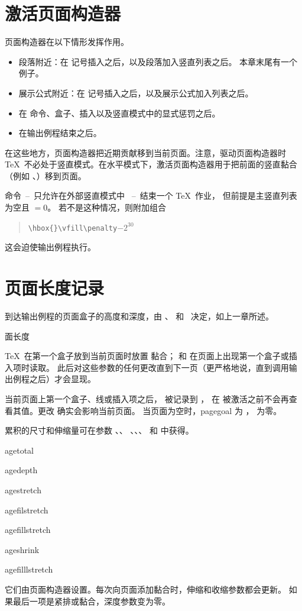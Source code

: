 \documentclass[a4paper]{rapport3}
\makeatletter
\def\ldash{\unskip\ --\nobreak\ \ignorespaces}
\def\rdash{\unskip\nobreak\ --\ \ignorespaces}
\newenvironment{disp}{\begin{quotation}}{\end{quotation}}
\def\term#1\par{\index{#1}}
\def\cstoidx#1\par{\index{#1@\cs{#1}}}
\makeatother
\begin{document}
\section{激活页面构造器}

页面构造器在以下情形发挥作用。
\begin{itemize}\item 段落附近：在  记号插入之后，以及段落加入竖直列表之后。
    本章末尾有一个例子。
\item 展示公式附近：在  记号插入之后，以及展示公式加入列表之后。
\item 在  命令、盒子、插入以及竖直模式中的显式惩罚之后。
\item 在输出例程结束之后。\end{itemize}
在这些地方，页面构造器把近期贡献移到当前页面。注意，驱动页面构造器时
\TeX\ 不必处于竖直模式。在水平模式下，激活页面构造器用于把前面的竖直黏合
（例如 、）移到页面。

 命令\ldash 只允许在外部竖直模式中 \rdash 结束一个 \TeX\ 作业，
但前提是主竖直列表为空且 ${}=0$。
若不是这种情况，则附加组合
\label{end:play}%
\begin{disp}\verb>\hbox{}\vfill\penalty>$-2^{30}$\end{disp}
这会迫使输出例程执行。

\section{页面长度记录}

到达输出例程的页面盒子的高度和深度，由 、
和~ 决定，如上一章所述。\term 页面长度\par
\TeX\ 在第一个盒子放到当前页面时放置  黏合；
 和  在页面上出现第一个盒子或插入项时读取。
此后对这些参数的任何更改直到下一页（更严格地说，直到调用输出例程之后）才会显现。

当前页面上第一个盒子、线或插入项之后， 被记录到 ，
在  被激活之前不会再查看其值。更改  确实会影响当前页面。
当页面为空时，pagegoal 为 ， 为零。

累积的尺寸和伸缩量可在参数 、、
、、、
和  中获得。
\cstoidx pagetotal\par\cstoidx pagedepth\par
\cstoidx pagestretch\par\cstoidx pagefilstretch\par
\cstoidx pagefillstretch\par
\cstoidx pageshrink\par\cstoidx pagefilllstretch\par
它们由页面构造器设置。每次向页面添加黏合时，伸缩和收缩参数都会更新。
如果最后一项是紧排或黏合，深度参数变为零。
\end{document}
